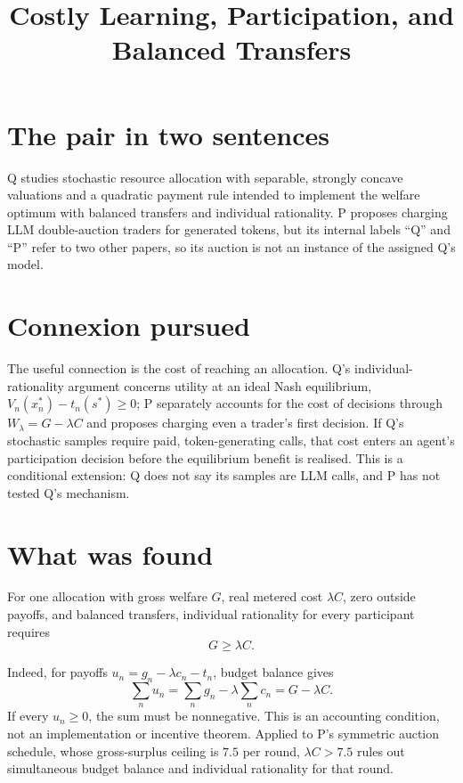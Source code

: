 \documentclass{article}
\title{Costly Learning, Participation, and Balanced Transfers}
\begin{document}
\maketitle

\section{The pair in two sentences}
Q studies stochastic resource allocation with separable, strongly concave valuations and a quadratic payment rule intended to implement the welfare optimum with balanced transfers and individual rationality. P proposes charging LLM double-auction traders for generated tokens, but its internal labels ``Q'' and ``P'' refer to two other papers, so its auction is not an instance of the assigned Q's model. 

\section{Connexion pursued}
The useful connection is the cost of reaching an allocation. Q's individual-rationality argument concerns utility at an ideal Nash equilibrium, \(V_n(x_n^*)-t_n(s^*)\geq 0\); P separately accounts for the cost of decisions through \(W_{\lambda}=G-\lambda C\) and proposes charging even a trader's first decision. If Q's stochastic samples require paid, token-generating calls, that cost enters an agent's participation decision before the equilibrium benefit is realised. This is a conditional extension: Q does not say its samples are LLM calls, and P has not tested Q's mechanism. 

\section{What was found}
\begin{claim}
For one allocation with gross welfare \(G\), real metered cost \(\lambda C\), zero outside payoffs, and balanced transfers, individual rationality for every participant requires
\[
G\geq\lambda C.
\]
\end{claim}
Indeed, for payoffs \(u_n=g_n-\lambda c_n-t_n\), budget balance gives
\[
\sum_n u_n=\sum_n g_n-\lambda\sum_n c_n=G-\lambda C.
\]
If every \(u_n\geq0\), the sum must be nonnegative. This is an accounting condition, not an implementation or incentive theorem. Applied to P's symmetric auction schedule, whose gross-surplus ceiling is \(7.5\) per round, \(\lambda C>7.5\) rules out simultaneous budget balance and individual rationality for that round. 
\end{document}
